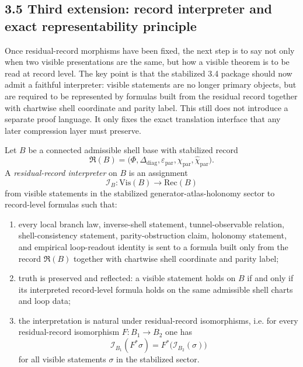 \subsection*{3.5 Third extension: record interpreter and exact representability principle}
Once residual-record morphisms have been fixed, the next step is to say not only when two visible presentations are the same, but how a visible theorem is to be read at record level. The key point is that the stabilized 3.4 package should now admit a faithful interpreter: visible statements are no longer primary objects, but are required to be represented by formulas built from the residual record together with chartwise shell coordinate and parity label. This still does not introduce a separate proof language. It only fixes the exact translation interface that any later compression layer must preserve.

\begin{definition}
\label{def:mainline-3502}
Let $B$ be a connected admissible shell base with stabilized record
\[
  \mathfrak R(B)=\bigl(\Phi,\Delta_{\mathrm{diag}},\varepsilon_{\mathrm{par}},\chi_{\mathrm{par}},\widehat\chi_{\mathrm{par}}\bigr).
\]
A \emph{residual-record interpreter} on $B$ is an assignment
\[
  \mathcal I_B : \mathrm{Vis}(B) \longrightarrow \mathrm{Rec}(B)
\]
from visible statements in the stabilized generator-atlas-holonomy sector to record-level formulas such that:
\begin{enumerate}[label=(\roman*), leftmargin=2em]
  \item every local branch law, inverse-shell statement, tunnel-observable relation, shell-consistency statement, parity-obstruction claim, holonomy statement, and empirical loop-readout identity is sent to a formula built only from the record $\mathfrak R(B)$ together with chartwise shell coordinate and parity label;
  \item truth is preserved and reflected: a visible statement holds on $B$ if and only if its interpreted record-level formula holds on the same admissible shell charts and loop data;
  \item the interpretation is natural under residual-record isomorphisms, i.e. for every residual-record isomorphism $F:B_1\to B_2$ one has
  \[
    \mathcal I_{B_1}(F^*\sigma)=F^*\bigl(\mathcal I_{B_2}(\sigma)\bigr)
  \]
  for all visible statements $\sigma$ in the stabilized sector.
\end{enumerate}
\end{definition}

